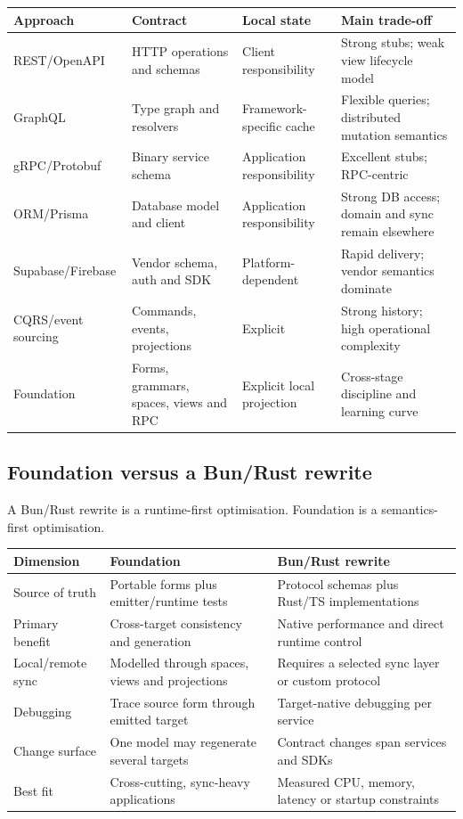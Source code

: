 \documentclass[10pt]{article}
\begin{document}
\begin{tabularx}{\textwidth}{P{27mm}YYY}
\toprule
\textbf{Approach} & \textbf{Contract} & \textbf{Local state} & \textbf{Main trade-off} \\
\midrule
REST/OpenAPI & HTTP operations and schemas & Client responsibility & Strong stubs; weak view lifecycle model \\
GraphQL & Type graph and resolvers & Framework-specific cache & Flexible queries; distributed mutation semantics \\
gRPC/Protobuf & Binary service schema & Application responsibility & Excellent stubs; RPC-centric \\
ORM/Prisma & Database model and client & Application responsibility & Strong DB access; domain and sync remain elsewhere \\
Supabase/Firebase & Vendor schema, auth and SDK & Platform-dependent & Rapid delivery; vendor semantics dominate \\
CQRS/event sourcing & Commands, events, projections & Explicit & Strong history; high operational complexity \\
Foundation & Forms, grammars, spaces, views and RPC & Explicit local projection & Cross-stage discipline and learning curve \\
\bottomrule
\end{tabularx}

\subsection{Foundation versus a Bun/Rust rewrite}

A Bun/Rust rewrite is a runtime-first optimisation. Foundation is a semantics-first optimisation.

\begin{tabularx}{\textwidth}{P{31mm}YY}
\toprule
\textbf{Dimension} & \textbf{Foundation} & \textbf{Bun/Rust rewrite} \\
\midrule
Source of truth & Portable forms plus emitter/runtime tests & Protocol schemas plus Rust/TS implementations \\
Primary benefit & Cross-target consistency and generation & Native performance and direct runtime control \\
Local/remote sync & Modelled through spaces, views and projections & Requires a selected sync layer or custom protocol \\
Debugging & Trace source form through emitted target & Target-native debugging per service \\
Change surface & One model may regenerate several targets & Contract changes span services and SDKs \\
Best fit & Cross-cutting, sync-heavy applications & Measured CPU, memory, latency or startup constraints \\
\bottomrule
\end{tabularx}
\end{document}
